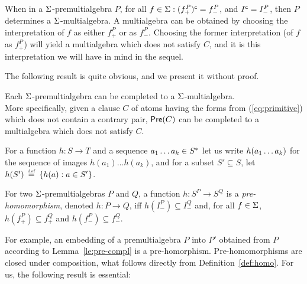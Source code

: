 When in a $\Sigma$-premultialgebra $P$, for all \(f\in\Sigma :
(f^P_+)^{\sf c} = f^P_-\), and \(I^{\sf c} = I^P_-\), then $P$ determines a $\Sigma
$-multialgebra. A multialgebra can be obtained by choosing the 
interpretation of $f$ as either $f^P_+$ or as $f^P_-$.
Choosing the former
interpretation (of $f$ as $f^P_+$) will yield a multialgebra which does not
satisfy $C$, and it is this interpretation we will have in mind in the sequel.

The following result is quite obvious, and we present it
without proof.

\begin{lemma}\label {le:pre-compl}
Each $\Sigma $-premultialgebra can be completed to a $\Sigma $-multialgebra. \\
More specifically, given a clause $C$ of atoms having the forms from (\ref{eq:primitive})
which does not contain a contrary pair, ${\sf Pre}(C)$ can be 
completed to a multialgebra which does not satisfy $C$.
\end{lemma}

For a function \(h: S\to T\) and a sequence \(a_{1}\ldots a_{k}\in S^*\) let us write
\(h(a_{1}\ldots a_{k} )\) for the sequence of images \(h(a_1)\ldots h(a_k)\), 
and for a subset \(S'\subseteq S\), let \(h(S' )\,\mathrel {\stackrel {\mbox {\tiny def}}{=}\:}\{ h(a) :a\in S'\}\).

\begin{definition}\label {def:homo} For two $\Sigma $-premultialgebras $P$
and $Q$, a function \(h: S^P\to S^Q\) is a {\em pre-\-ho\-mo\-morphism},
denoted \(h: P\to Q\), iff \(h(I^P_-)\subseteq I^Q_-\) and, for all \(f\in
\Sigma\), \(h(f^P_+)\subseteq f^Q_+\) and \(h(f^P_-)\subseteq f^Q_-\).
\end{definition}

For example, an embedding of a premultialgebra $P$ into $P'$ obtained
from $P$ according to Lemma~\ref{le:pre-compl} is a pre-homorphism.
Pre-homomorphisms are closed under composition, what follows directly from
Definition~\ref {def:homo}.  For us, the following result is essential:

